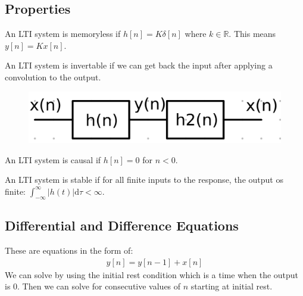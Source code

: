 \documentclass[12pt,letterpaper]{article} \usepackage{amsmath} \usepackage{graphicx} \usepackage[margin=1in]{geometry} \usepackage{longtable}  \usepackage{amssymb}
\begin{document}
	\subsection{Properties}
	An LTI system is memoryless if $h[n] = K\delta[n]$ where $k \in \mathbb R$. This means $y[n] = Kx[n]$.
	
	An LTI system is invertable if we can get back the input after applying a convolution to the output. 
	\begin{figure}[H]
		\centering
		\includegraphics[width=0.4\linewidth]{images/invertability}
		\label{fig:invertability}
	\end{figure}
	
	An LTI system is causal if $h[n] = 0$ for $n < 0$.
	
	An LTI system is stable if for all finite inputs to the response, the output os finite: $\int^{\infty}_{-\infty} |h(t)|\mathrm d \tau < \infty$.
	\subsection{Differential and Difference Equations}
	These are equations in the form of:
	\begin{align*}
		y[n] = y[n-1] + x[n]
	\end{align*}
	We can solve by using the initial rest condition which is a time when the output is 0. Then we can solve for consecutive values of $n$ starting at initial rest. 
	
\end{document}
